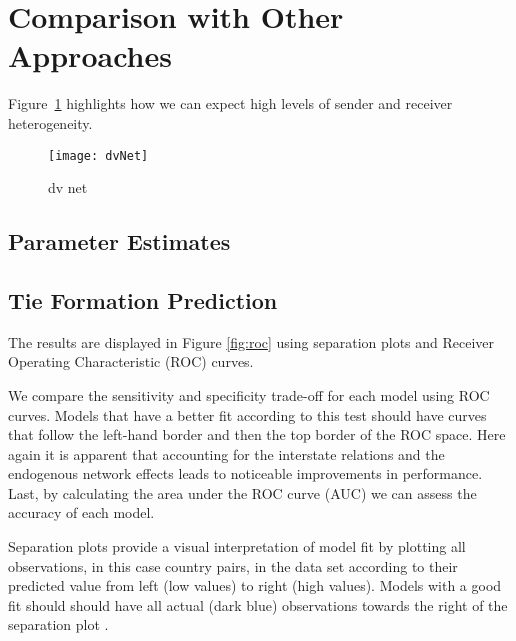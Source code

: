 \section{\textbf{Comparison with Other Approaches}}



\citet{ingold:2008}

\citet{ingold:fischer:2014}

\citet{ingold:leifeld:2014}

Figure~\ref{fig:dvNet} highlights how we can expect high levels of sender and receiver heterogeneity. 

\begin{figure}[ht]
	\centering
	\texttt{[image: dvNet]}
	\caption{dv net}
	\label{fig:dvNet}
\end{figure}
\FloatBarrier

\citet{krivitsky:handcock:2015}

\subsection{Parameter Estimates}


\FloatBarrier

\subsection{Tie Formation Prediction}

The results are displayed in Figure \ref{fig:roc} using separation plots and Receiver Operating Characteristic (ROC) curves.

We compare the sensitivity and specificity trade-off for each model using ROC curves. Models that have a better fit according to this test should have curves that follow the left-hand border and then the top border of the ROC space. Here again it is apparent that accounting for the interstate relations and the endogenous network effects leads to noticeable improvements in performance. Last, by calculating the area under the ROC curve (AUC) we can assess the accuracy of each model.

Separation plots provide a visual interpretation of model fit by plotting all observations, in this case country pairs, in the data set according to their predicted value from left (low values) to right (high values). Models with a good fit should should have all actual (dark blue) observations towards the right of the separation plot \citep{greenhill:etal:2011}.

